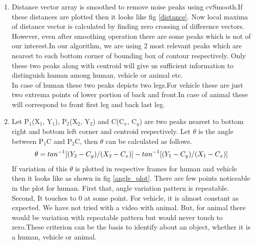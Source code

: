 \documentclass[conference]{IEEEtran}
\begin{document}
\begin{enumerate}
\item Distance vector array is smoothed to remove noise peaks using
cvSmooth.If these distances are plotted then it looks like fig
\ref{distance}. Now local maxima of distance vector is
calculated by finding zero crossing of difference vectors.\\ However,
even after smoothing operation there are some peaks which is not of our
interest.In our algorithm, we are using 2 most relevant peaks which are
nearest to each bottom corner of bounding box of contour respectively.
Only these two peaks along with centroid will give us sufficient information
to distinguish human among human, vehicle or animal etc.\\
In case of human these two peaks depicts two legs.For vehicle these are
just two extrema points of lower portion of back and front.In case of
animal these will correspond to front first leg and back last leg.
\item Let P$_1$(X$_1$, Y$_1$), P$_2$(X$_2$, Y$_2$) and C(C$_x$, C$_y$) are two peaks
nearest to bottom right and bottom left corner and centroid
respectively. Let $\theta$ is the angle between P$_1$C and P$_2$C, then
$\theta$ can be calculated as follows.\\
%
	\begin{equation}
	\theta = tan^{-1}[(Y_2 - C_y) / (X_2 - C_x)] \\ - tan^{-1}[(Y_1 - C_y) / (X_1 - C_x)]
	\end{equation}
%
If variation of this $\theta$ is plotted in respective frames for human
and vehicle then it looks like as shown in fig \ref{angle_plot}. There
are few points noticeable in the plot for human. First that, angle
variation pattern is repeatable. Second, It touches to 0 at some point.
For vehicle, it is almost constant as expected. We have not tried with a
video with animal. But, for animal there would be variation with
repeatable pattern but would never touch to zero.These criterion can be
the basis to identify about an object, whether it is a human, vehicle or
animal.


\end{enumerate}
\end{document}
